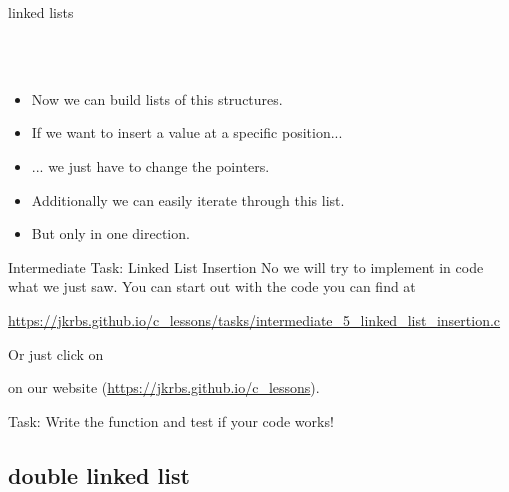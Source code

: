\documentclass[10pt,graphics,aspectratio=169,table]{beamer}
\begin{document}
\begin{frame}{linked lists}
\begin{tikzpicture}[scale=.73,font=\scriptsize]
		
	\end{tikzpicture}
	\ \\\ \\
	\begin{itemize}[<+->]
		\item Now we can build lists of this structures.
		\item If we want to insert a value at a specific position...
		\item ... we just have to change the pointers.
	\end{itemize}
	
	\begin{itemize}
		\item<6-> Additionally we can easily iterate through this list.
		\item<6-> But only in one direction.
	\end{itemize}
	
\end{frame}

\begin{frame}{Intermediate Task: Linked List Insertion}
    No we will try to implement in code what we just saw.
    You can start out with the code you can find at

    \small
    \url{https://jkrbs.github.io/c_lessons/tasks/intermediate_5_linked_list_insertion.c}
    
    Or just click on 
   
    on our website (\url{https://jkrbs.github.io/c_lessons}).


    Task: Write the function  and test if your code works!

\end{frame}

\subsection{double linked list}
\end{document}
